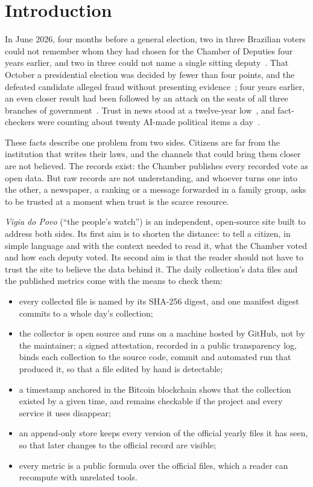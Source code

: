 \section{Introduction}
\label{sec:intro}

In June 2026, four months before a general election, two in three Brazilian voters could not remember whom they had chosen for the Chamber of Deputies four years earlier, and two in three could not name a single sitting deputy~\citep{folha2026votememory}. That October a presidential election was decided by fewer than four points, and the defeated candidate alleged fraud without presenting evidence~\citep{tse2026runoff,cnn2026letter}; four years earlier, an even closer result had been followed by an attack on the seats of all three branches of government~\citep{tse2022result,stf8jan}. Trust in news stood at a twelve-year low~\citep{carro2026brazil}, and fact-checkers were counting about twenty AI-made political items a day~\citep{lupa2026vigia}.

These facts describe one problem from two sides. Citizens are far from the institution that writes their laws, and the channels that could bring them closer are not believed. The records exist: the Chamber publishes every recorded vote as open data. But raw records are not understanding, and whoever turns one into the other, a newspaper, a ranking or a message forwarded in a family group, asks to be trusted at a moment when trust is the scarce resource.

\emph{Vigia do Povo} (``the people's watch'') is an independent, open-source site built to address both sides. Its first aim is to shorten the distance: to tell a citizen, in simple language and with the context needed to read it, what the Chamber voted and how each deputy voted. Its second aim is that the reader should not have to trust the site to believe the data behind it. The daily collection's data files and the published metrics come with the means to check them:

\begin{itemize}[leftmargin=1.4em,itemsep=2pt]
\item every collected file is named by its SHA-256 digest, and one manifest digest commits to a whole day's collection;
\item the collector is open source and runs on a machine hosted by GitHub, not by the maintainer; a signed attestation, recorded in a public transparency log, binds each collection to the source code, commit and automated run that produced it, so that a file edited by hand is detectable;
\item a timestamp anchored in the Bitcoin blockchain shows that the collection existed by a given time, and remains checkable if the project and every service it uses disappear;
\item an append-only store keeps every version of the official yearly files it has seen, so that later changes to the official record are visible;
\item every metric is a public formula over the official files, which a reader can recompute with unrelated tools.
\end{itemize}

